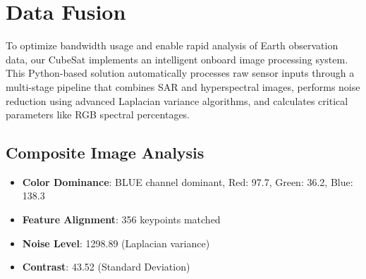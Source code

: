 \documentclass[12pt]{article}
\begin{document}
\section{Data Fusion}
To optimize bandwidth usage and enable rapid analysis of Earth observation data, our CubeSat implements an intelligent onboard image processing system. This Python-based solution automatically processes raw sensor inputs through a multi-stage pipeline that combines SAR and hyperspectral images, performs noise reduction using advanced Laplacian variance algorithms, and calculates critical parameters like RGB spectral percentages.

\subsection{Composite Image Analysis}
\begin{itemize}
    \item \textbf{Color Dominance}: BLUE channel dominant, Red: 97.7, Green: 36.2, Blue: 138.3
    \item \textbf{Feature Alignment}: 356 keypoints matched
    \item \textbf{Noise Level}: 1298.89 (Laplacian variance)
    \item \textbf{Contrast}: 43.52 (Standard Deviation)
\end{itemize}
\end{document}

